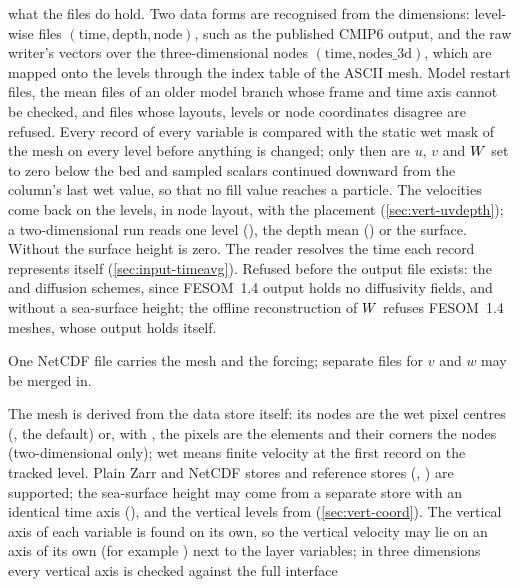 \begin{description}[font=\normalfont\bfseries,style=nextline,leftmargin=1.5em]
    what the files do hold. Two data forms are recognised from the dimensions: level-wise files
    $(\text{time},\text{depth},\text{node})$, such as the published CMIP6 output, and the raw writer's
    vectors over the three-dimensional nodes $(\text{time},\text{nodes\_3d})$, which are mapped onto the
    levels through the index table of the ASCII mesh. Model restart files, the mean files of an older model
    branch whose frame and time axis cannot be checked, and files whose layouts, levels or node coordinates
    disagree are refused. Every record of every variable is compared with the static wet mask of the mesh
    on every level before anything is changed; only then are $u$, $v$ and $W$ set to zero below the bed
    and sampled scalars continued downward from the column's last wet value, so that no fill value reaches a
    particle. The velocities come back on the levels, in node layout, with the placement 
    (\cref{sec:vert-uvdepth}); a two-dimensional run reads one level (), the depth
    mean () or the surface. Without  the surface height is zero. The
    reader resolves the time each record represents itself (\cref{sec:input-timeavg}). Refused before the
    output file exists: the  and  diffusion schemes, since FESOM~1.4 output holds no
    diffusivity fields, and  without a sea-surface height; the offline
    reconstruction of $W$ refuses FESOM~1.4 meshes, whose output holds  itself.
  \item[FESOM-C] One NetCDF file carries the mesh and the forcing; separate files for $v$ and $w$ may be
    merged in.
  \item[HEALPix] The mesh is derived from the data store itself: its nodes are the wet pixel centres
    (, the default) or, with , the pixels are the elements
    and their corners the nodes (two-dimensional only); wet means finite velocity at the first record on
    the tracked level. Plain Zarr and NetCDF stores and
    reference stores (, ) are supported; the sea-surface height may come from a
    separate store with an identical time axis (), and the vertical levels from
     (\cref{sec:vert-coord}). The vertical axis of each variable is found on its own,
    so the vertical velocity may lie on an axis of its own (for example ) next to the
    layer variables; in three dimensions every vertical axis is checked against the full interface

\end{description}
